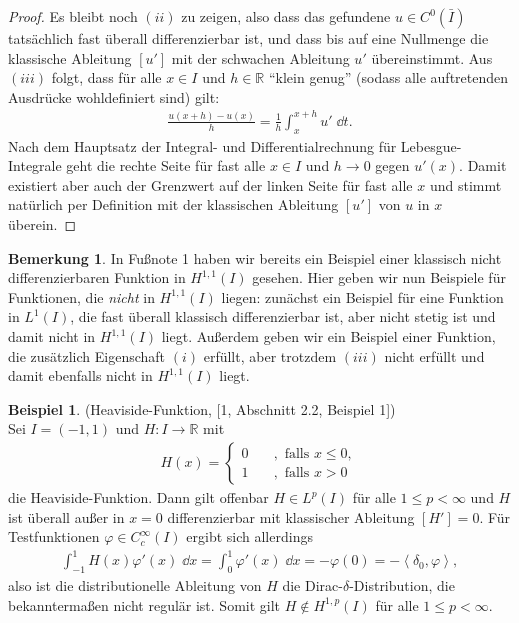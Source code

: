 \documentclass[twoside]{article}
\renewcommand{\cite}[1]{[#1]}
\theoremstyle{definition}
\newtheorem{remark}[theorem]{Bemerkung}
\newtheorem{example}[theorem]{Beispiel}
\newcommand{\R}{\mathbb{R}}
\newcommand{\lek}{\left[}
\newcommand{\rek}{\right]}
\newcommand{\lkr}{\left<}
\newcommand{\rkr}{\right>}
\let\footnote=\endnote
\begin{document}
\begin{proof}
Es bleibt noch $(ii)$ zu zeigen, also dass das gefundene $u \in C^0(\bar{I})$ tatsächlich fast überall differenzierbar ist, und dass bis auf eine Nullmenge die klassische Ableitung $[u']$ mit der schwachen Ableitung $u'$ übereinstimmt. Aus $(iii)$ folgt, dass für alle $x \in I$ und $h \in \R$ \enquote{klein genug} (sodass alle auftretenden Ausdrücke wohldefiniert sind) gilt:
\begin{align*}
\frac{u(x+h) - u(x)}{h} = \frac{1}{h} \int_{x}^{x+h} u' \;  \dd t.
\end{align*}
Nach dem Hauptsatz der Integral- und Differentialrechnung für Lebesgue-Integrale\footnote{Für weitere Details siehe \cite{2}.} geht die rechte Seite für fast alle $x \in I$ und $h \to 0$ gegen $u'(x)$. Damit existiert aber auch der Grenzwert auf der linken Seite für fast alle $x$ und stimmt natürlich per Definition mit der klassischen Ableitung $[u']$ von $u$ in $x$ überein.
\end{proof}
\begin{remark}
In Fußnote 1 haben wir bereits ein Beispiel einer klassisch nicht differenzierbaren Funktion in $H^{1,1}(I)$ gesehen. Hier geben wir nun Beispiele für Funktionen, die \textit{nicht} in $H^{1,1}(I)$ liegen: zunächst ein Beispiel für eine Funktion in $L^1(I)$, die fast überall klassisch differenzierbar ist, aber nicht stetig ist und damit nicht in $H^{1,1}(I)$ liegt. Außerdem geben wir ein Beispiel einer Funktion, die zusätzlich Eigenschaft $(i)$ erfüllt, aber trotzdem $(iii)$ nicht erfüllt und damit ebenfalls nicht in $H^{1,1}(I)$ liegt. 
\end{remark}
\begin{example} (Heaviside-Funktion, [1, Abschnitt 2.2, Beispiel 1])\\
Sei $I = (-1,1)$ und $H: I \to \R$ mit
\begin{align*}
H(x) = \begin{cases}
0 \quad &, \text{ falls } x \leq 0,\\
1 \quad &, \text{ falls } x > 0
\end{cases}
\end{align*}
die Heaviside-Funktion. Dann gilt offenbar $H \in L^p(I)$ für alle $1 \leq p < \infty$ und $H$ ist überall außer in $x = 0$ differenzierbar mit klassischer Ableitung $\lek H' \rek = 0$. Für Testfunktionen $\varphi \in C^\infty_c(I)$ ergibt sich allerdings
\begin{align*}
\int_{-1}^1 H(x) \varphi'(x) \; \dd x = \int_0^1 \varphi'(x) \; \dd x = - \varphi(0) = - \lkr \delta_0, \varphi \rkr,
\end{align*}
also ist die distributionelle Ableitung von $H$ die Dirac-$\delta$-Distribution, die bekanntermaßen nicht regulär ist. Somit gilt $H \not \in H^{1,p}(I)$ für alle $1 \leq p < \infty$.
\end{example}
\end{document}
